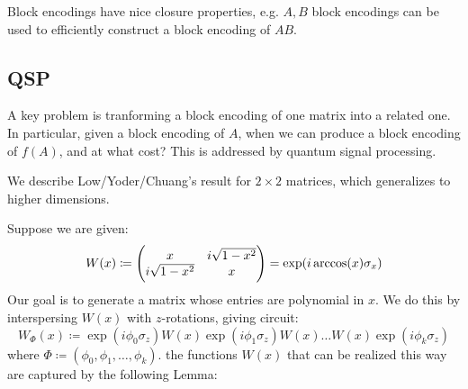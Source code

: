 Block encodings have nice closure properties, e.g. $A, B$ block encodings can be used to efficiently construct a block encoding of $AB$.

\subsection*{QSP}
A key problem is tranforming a block encoding of one matrix into a related one. In particular, given a block encoding of $A$, when we can produce a block encoding of $f(A)$, and at what cost? This is addressed by quantum signal processing.

We describe Low/Yoder/Chuang's result for $2 \times 2$ matrices, which generalizes to higher dimensions.

Suppose we are given:
\begin{equation}
    W(x) \coloneqq \begin{pmatrix}x & i\sqrt{1-x^2} \\ i\sqrt{1-x^2} & x\end{pmatrix} = \exp(i\arccos(x)\sigma_x)
\end{equation}
Our goal is to generate a matrix whose entries are polynomial in $x$. We do this by interspersing $W(x)$ with $z$-rotations, giving circuit:
\begin{equation}
    W_\Phi(x) \coloneqq \exp(i\phi_0 \sigma_z)W(x)\exp(i\phi_1\sigma_z)W(x)\ldots W(x)\exp(i\phi_k\sigma_z)
\end{equation}
where $\Phi \coloneqq (\phi_0, \phi_1, \ldots, \phi_k)$. the functions $W(x)$ that can be realized this way are captured by the following Lemma:

